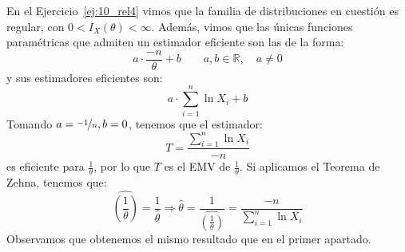 \begin{ejercicio}
\begin{enumerate}[label=\alph*)]
            En el Ejercicio~\ref{ej:10_rel4} vimos que la familia de distribuciones en cuestión es regular, con $0<I_X(\theta)<\infty$. Además, vimos que las únicas funciones paramétricas que admiten un estimador eficiente son las de la forma:
            \begin{equation*}
                a\cdot \frac{-n}{\theta} +b\qquad a,b\in \mathbb{R}, \quad a\neq 0
            \end{equation*}
            y sus estimadores eficientes son:
            \begin{equation*}
                a\cdot \sum_{i=1}^{n}\ln X_i + b
            \end{equation*}
            Tomando $a=\nicefrac{-1}{n},b=0$, tenemos que el estimador:
            \begin{equation*}
                T = \frac{\sum\limits_{i=1}^{n}\ln X_i}{-n}
            \end{equation*}
            es eficiente para $\frac{1}{\theta}$, por lo que $T$ es el EMV de $\frac{1}{\theta}$.
            Si aplicamos el Teorema de Zehna, tenemos que:
            \begin{equation*}
                \widehat{\left(\frac{1}{\theta}\right)} = \frac{1}{\widehat{\theta}} \Longrightarrow \widehat{\theta} = \frac{1}{\widehat{\left(\frac{1}{\theta}\right)} } = \frac{-n}{\sum\limits_{i=1}^{n}\ln X_i}
            \end{equation*}
            Observamos que obtenemos el mismo resultado que en el primer apartado.
    \end{enumerate}
\end{ejercicio}

